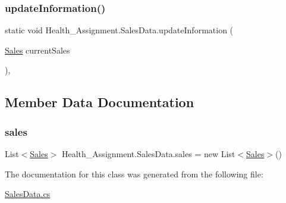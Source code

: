 \subsubsection{\texorpdfstring{update\+Information()}{updateInformation()}}
{\footnotesize\ttfamily static void Health\+\_\+\+Assignment.\+Sales\+Data.\+update\+Information (\begin{DoxyParamCaption}\item[{\hyperlink{class_health___assignment_1_1_sales}{Sales}}]{current\+Sales }\end{DoxyParamCaption})\hspace{0.3cm}{\ttfamily [inline]}, {\ttfamily [static]}}



\subsection{Member Data Documentation}
\mbox{\label{class_health___assignment_1_1_sales_data_a0a76f0dd60503ccf76db4dc605f76460}} 
\subsubsection{\texorpdfstring{sales}{sales}}
{\footnotesize\ttfamily List$<$\hyperlink{class_health___assignment_1_1_sales}{Sales}$>$ Health\+\_\+\+Assignment.\+Sales\+Data.\+sales = new List$<$\hyperlink{class_health___assignment_1_1_sales}{Sales}$>$()\hspace{0.3cm}{\ttfamily [static]}}



The documentation for this class was generated from the following file\+:\begin{DoxyCompactItemize}
\item 
\hyperlink{_sales_data_8cs}{Sales\+Data.\+cs}\end{DoxyCompactItemize}
